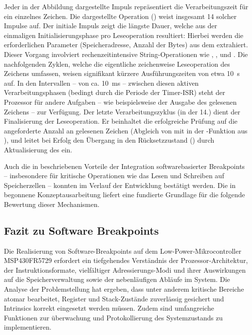 \newpage
Jeder in der Abbildung dargestellte Impuls repr\"asentiert die Verarbeitungszeit f\"ur ein einzelnes Zeichen. Die dargestellte Operation () weist insgesamt 14 solcher Impulse auf. Der initiale Impuls zeigt die l\"angste Dauer, welche aus der einmaligen Initialisierungsphase pro Leseoperation resultiert: Hierbei werden die erforderlichen Parameter (Speicheradresse, Anzahl der Bytes) aus dem  extrahiert. Dieser Vorgang involviert rechenzeitintensive String-Operationen wie , ,  und . Die nachfolgenden Zyklen, welche die eigentliche zeichenweise Leseoperation des Zeichens umfassen, weisen signifikant k\"urzere Ausf\"uhrungszeiten von etwa 10~\textmu s auf. In den Intervallen -- von ca. 10~ms -- zwischen diesen aktiven Verarbeitungsphasen (bedingt durch die Periode der Timer-ISR) steht der Prozessor f\"ur andere Aufgaben -- wie beispielsweise der Ausgabe des gelesenen Zeichens -- zur Verf\"ugung. Der letzte Verarbeitungszyklus (in  der 14.) dient der Finalisierung der Leseoperation. Er beinhaltet die erfolgreiche Pr\"ufung auf die angeforderte Anzahl an gelesenen Zeichen (Abgleich von  mit  in der -Funktion aus ), und leitet bei Erfolg den \"Ubergang in den R\"ucksetzzustand () durch Aktualisierung des  ein.

Auch die in  beschriebenen Vorteile der Integration softwarebasierter Breakpoints -- insbesondere f\"ur kritische Operationen wie das Lesen und Schreiben auf Speicherzellen -- konnten im Verlauf der Entwicklung best\"atigt werden. Die in  begonnene Konzeptausarbeitung liefert eine fundierte Grundlage f\"ur die folgende Bewertung dieser Mechanismen.\AI


\newpage
\subsection{Fazit zu Software Breakpoints}
\label{sec:FazitSoftwareBreakpoints}

Die Realisierung von Software-Breakpoints auf dem Low‑Power‑Mikrocontroller \\MSP430FR5729 erfordert ein tiefgehendes Verst\"andnis der Prozessor‑Architektur, der Instruktionsformate, vielf\"altiger Adressierungs-Modi und ihrer Auswirkungen auf die Speicherverwaltung sowie der nebenl\"aufigen Abl\"aufe im System. Die Analyse der Problemstellung hat ergeben, dass unter anderem kritische Bereiche atomar bearbeitet, Register und Stack-Zust\"ande zuverl\"assig gesichert und Intrinsics korrekt eingesetzt werden m\"ussen. Zudem sind umfangreiche Funktionen zur \"uberwachung und Protokollierung des Systemzustands zu implementieren.

